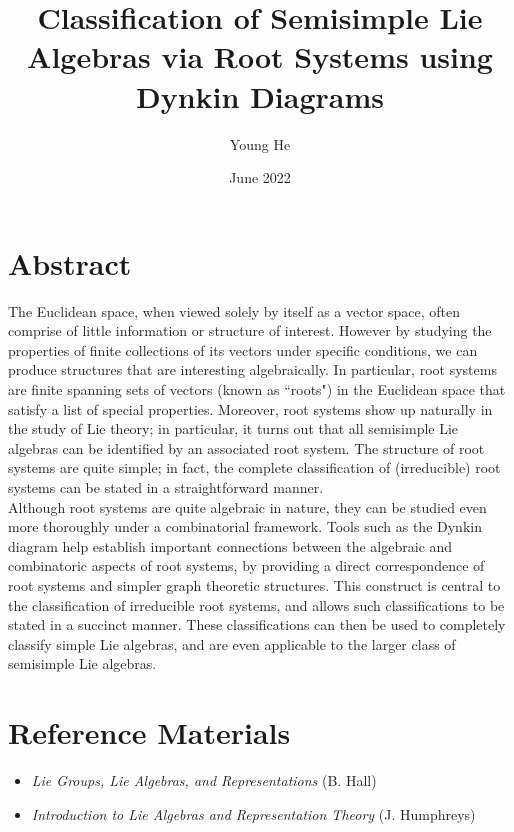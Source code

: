\documentclass{article}
\title{Classification of Semisimple Lie Algebras via Root Systems using Dynkin Diagrams}
\author{Young He}
\date{June 2022}
\theoremstyle{definition}
\begin{document}
\maketitle

\section*{Abstract}
\quad The Euclidean space, when viewed solely by itself as a vector space, often comprise of little information or structure of interest. However by studying the properties of finite collections of its vectors under specific conditions, we can produce structures that are interesting algebraically. In particular, root systems are finite spanning sets of vectors (known as ``roots") in the Euclidean space that satisfy a list of special properties. Moreover, root systems show up naturally in the study of Lie theory; in particular, it turns out that all semisimple Lie algebras can be identified by an associated root system. The structure of root systems are quite simple; in fact, the complete classification of (irreducible) root systems can be stated in a straightforward manner. \\

Although root systems are quite algebraic in nature, they can be studied even more thoroughly under a combinatorial framework. Tools such as the Dynkin diagram help establish important connections between the algebraic and combinatoric aspects of root systems, by providing a direct correspondence of root systems and simpler graph theoretic structures. This construct is central to the classification of irreducible root systems, and allows such classifications to be stated in a succinct manner. These classifications can then be used to completely classify simple Lie algebras, and are even applicable to the larger class of semisimple Lie algebras. 

\section*{Reference Materials}
\begin{itemize}
    \item \textit{Lie Groups, Lie Algebras, and Representations} (B. Hall)
    \item \textit{Introduction to Lie Algebras and Representation Theory} (J. Humphreys)
\end{itemize}

\newpage
\end{document}
